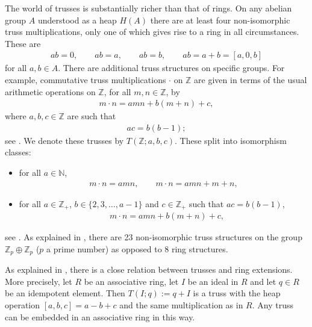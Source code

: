 \documentclass[pdftex]{sigma}
\numberwithin{equation}{section}
\newcommand{\N}{\mathbb N}
\newcommand{\Z}{\mathbb Z}
\begin{document}
\begin{Remark}\label{rem.trusses} The world of trusses is substantially richer than that of rings. On any abelian group $A$ understood as a heap $H(A)$ there are at least four non-isomorphic truss multiplications, only one of which gives rise to a ring in all circumstances. These are
\begin{gather}\label{truss.ab}
ab = 0, \qquad ab=a, \qquad ab=b, \qquad ab=a+b= [a,0,b]
\end{gather}
for all $a,b\in A$. There are additional truss structures on specific groups. For example, commutative truss multiplications $\cdot$ on $\Z$ are given in terms of the usual arithmetic operations on $\Z$, for all $m,n\in \Z$, by
\begin{gather}\label{truss.z}
 m\cdot n =amn +b(m+n) +c,
\end{gather}
where $a,b,c\in \Z$ are such that
\begin{gather}\label{truss.z.constraint}
 ac=b(b-1);
\end{gather}
see \cite[Theorem~3.51]{Brz:par}. We denote these trusses by $T(\Z;a,b,c)$. These split into isomorphism classes:
\begin{itemize}\itemsep=0pt
 \item[(1)] for all $a\in \N$,
\begin{align*}%
m\cdot n = amn,\qquad
m\cdot n = amn + m +n,
\end{align*}
\item[(2)] for all $a\in \Z_+$, $b\in \{2,3,\dots,a-1\}$ and $c\in \Z_+$ such that $ac = b(b-1)$,
\begin{align*}
&m\cdot n = amn +b(m+n) +c,
\end{align*}
\end{itemize}
see \cite[Corollary~3.53]{Brz:par}. As explained in \cite[Example~7.4]{AndBrzRyb:ext}, there are 23 non-isomorphic truss structures on the group $\Z_p\oplus \Z_p$ ($p$ a prime number) as opposed to 8 ring structures.
\end{Remark}

\begin{Remark}\label{rem.ideal}
 As explained in \cite{AndBrzRyb:ext}, there is a close relation between trusses and ring extensions. More precisely, let $R$ be an associative ring, let $I$ be an ideal in $R$ and let $q\in R$ be an idempotent element. Then
$ T(I;q) := q +I$
 is a truss with the heap operation $[a,b,c]=a-b+c$ and the same multiplication as in $R$. Any truss can be embedded in an associative ring in this way.
 \end{Remark}
\end{document}
